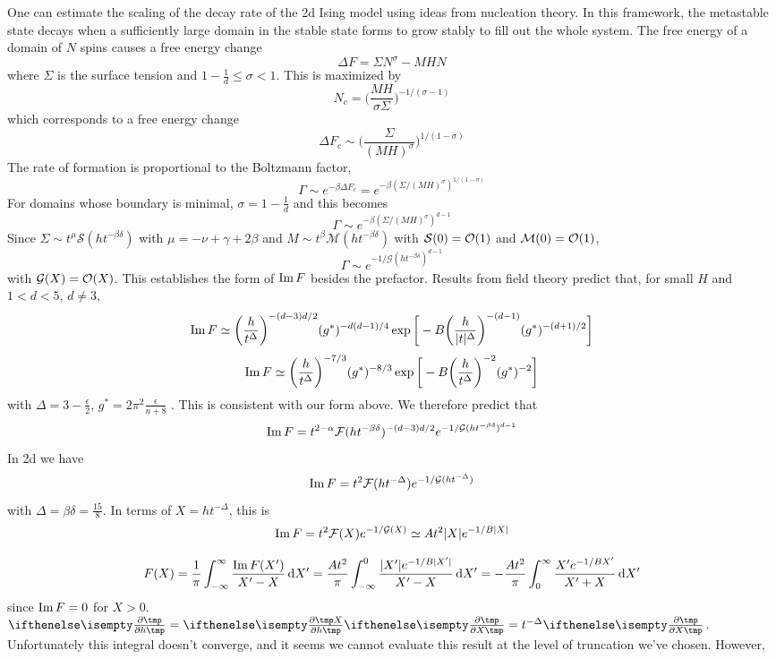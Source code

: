 \documentclass[fleqn]{article}
\begin{document}
One can estimate the scaling of the decay rate of the {\sc 2d} Ising model
using ideas from nucleation theory. In this framework, the metastable state
decays when a sufficiently large domain in the stable state forms to grow
stably to fill out the whole system. The free energy of a domain of $N$ spins
causes a free energy change
\[
  \Delta F=\Sigma N^\sigma-MHN
\]
where $\Sigma$ is the surface tension and $1-\frac1d\leq\sigma<1$. This is
maximized by
\[
  N_c=\bigg(\frac{MH}{\sigma\Sigma}\bigg)^{-1/(\sigma-1)}
\]
which corresponds to a free energy change
\[
  \Delta F_c\sim\bigg(\frac\Sigma{(MH)^\sigma}\bigg)^{1/(1-\sigma)}
\]
The rate of formation is proportional to the Boltzmann factor,
\[
  \Gamma\sim e^{-\beta \Delta
  F_c}=e^{-\beta(\Sigma/(MH)^\sigma)^{1/(1-\sigma)}}
\]
For domains whose boundary is minimal, $\sigma=1-\frac1d$ and this becomes
\[
  \Gamma\sim e^{-\beta(\Sigma/(MH)^\sigma)^{d-1}}
\]
Since $\Sigma\sim t^\mu\mathcal S(ht^{-\beta\delta})$ with $\mu=-\nu+\gamma+2\beta$
\cite{widom.1981.interface} and $M\sim t^\beta\mathcal M(ht^{-\beta\delta})$
with $\mathcal S(0)=\mathcal O(1)$ and $\mathcal M(0)=\mathcal O(1)$,
\[
  \Gamma\sim e^{-1/\mathcal G(ht^{-\beta\delta})^{d-1}}
\]
with $\mathcal G(X)=\mathcal O(X)$. This establishes the form of $\mathop{\mathrm{Im}}\nolimits F$
besides the prefactor. Results from field theory predict that, for small $H$
and $1<d<5$, $d\neq 3$,
\[
  \mathop{\mathrm{Im}}\nolimits F\simeq\bigg(\frac h{t^\Delta}\bigg)^{-(d-3)d/2}(g^*)^{-d(d-1)/4}
  \exp\bigg[-B\bigg(\frac h{|t|^\Delta}\bigg)^{-(d-1)}(g^*)^{-(d+1)/2}\bigg]
\]
\[
  \mathop{\mathrm{Im}}\nolimits F\simeq\bigg(\frac
  h{t^\Delta}\bigg)^{-7/3}(g^*)^{-8/3}\exp\bigg[-B\bigg(\frac
  h{t^\Delta}\bigg)^{-2}(g^*)^{-2}\bigg]
\]
with $\Delta=3-\frac\epsilon2$, $g^*=2\pi^2\frac\epsilon{n+8}$
\cite{houghton.1980.metastable,gunther.1980.goldstone}. This is consistent
with our form above. We therefore predict that
\[
  \mathop{\mathrm{Im}}\nolimits F=t^{2-\alpha}\mathcal F(ht^{-\beta\delta})^{-(d-3)d/2}e^{-1/\mathcal
    G(ht^{-\beta\delta})^{d-1}}
\]
In {\sc 2d} we have
\[
  \mathop{\mathrm{Im}}\nolimits F=t^2\mathcal F(ht^{-\Delta})e^{-1/\mathcal G(ht^{-\Delta})}
\]
with $\Delta=\beta\delta=\frac{15}8$. In terms of $X=ht^{-\Delta}$, this is
\[
  \mathop{\mathrm{Im}}\nolimits F=t^2\mathcal F(X)e^{-1/\mathcal G(X)}\simeq At^2|X|e^{-1/B|X|}
\]

\cite{langer.1967.condensation}

\[
  F(X)=\frac1\pi\int_{-\infty}^\infty\frac{\mathop{\mathrm{Im}}\nolimits F(X')}{X'-X}\,\mathrm d X'
  =\frac{At^2}\pi\int_{-\infty}^0\frac{|X'|e^{-1/B|X'|}}{X'-X}\,\mathrm d
  X'
  =-\frac{At^2}\pi\int_0^\infty\frac{X'e^{-1/BX'}}{X'+X}\,\mathrm d
  X'
\]
since $\mathop{\mathrm{Im}}\nolimits F=0$ for $X>0$. $\pd{}h=\pd Xh\pd{}X=t^{-\Delta}\pd{}X$.
Unfortunately this integral doesn't converge, and it seems we cannot evaluate
this result at the level of truncation we've chosen. However, 
\end{document}
